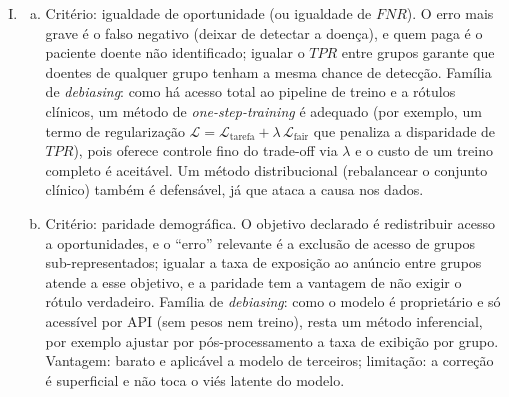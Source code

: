 \documentclass{dlproblemset}
\begin{document}
\begin{enumerate}[I)]
    \item
    \begin{enumerate}[(a)]
        \item Critério: igualdade de oportunidade (ou igualdade de $FNR$). O erro mais grave é o falso negativo (deixar de detectar a doença), e quem paga é o paciente doente não identificado; igualar o $TPR$ entre grupos garante que doentes de qualquer grupo tenham a mesma chance de detecção. Família de \textit{debiasing}: como há acesso total ao pipeline de treino e a rótulos clínicos, um método de \textit{one-step-training} é adequado (por exemplo, um termo de regularização $\mathcal{L}=\mathcal{L}_{\text{tarefa}}+\lambda\,\mathcal{L}_{\text{fair}}$ que penaliza a disparidade de $TPR$), pois oferece controle fino do trade-off via $\lambda$ e o custo de um treino completo é aceitável. Um método distribucional (rebalancear o conjunto clínico) também é defensável, já que ataca a causa nos dados.
        \item Critério: paridade demográfica. O objetivo declarado é redistribuir acesso a oportunidades, e o ``erro'' relevante é a exclusão de acesso de grupos sub-representados; igualar a taxa de exposição ao anúncio entre grupos atende a esse objetivo, e a paridade tem a vantagem de não exigir o rótulo verdadeiro. Família de \textit{debiasing}: como o modelo é proprietário e só acessível por API (sem pesos nem treino), resta um método inferencial, por exemplo ajustar por pós-processamento a taxa de exibição por grupo. Vantagem: barato e aplicável a modelo de terceiros; limitação: a correção é superficial e não toca o viés latente do modelo.
    \end{enumerate}


\end{enumerate}
\end{document}
